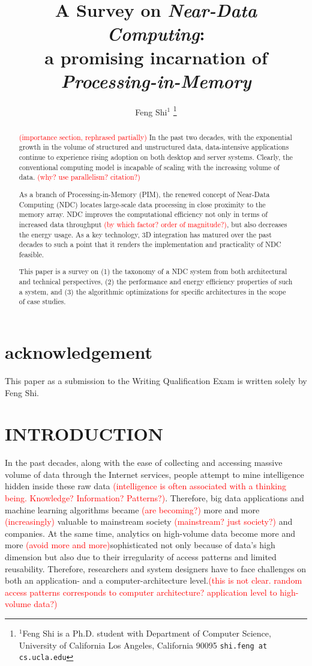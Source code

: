 \documentclass[letterpaper, 11pt, conference, margin=1in]{ieeeconf}   %
\title{\LARGE \bf
A Survey on \textit{Near-Data Computing}: \\ a promising incarnation of \textit{Processing-in-Memory}
}
\author{Feng Shi$^{1}$ %
\thanks{$^{1}$Feng Shi is a Ph.D. student with Department of Computer Science,
        University of California Los Angeles, California 90095
        {\tt\small shi.feng at cs.ucla.edu} }%
}
\newcommand\myworries[1]{\textcolor{red}{(#1)}}
\begin{document}
\maketitle
\thispagestyle{empty}
\pagestyle{empty}

\begin{abstract}
\myworries{importance section, rephrased partially}
In the past two decades, with the exponential growth in the volume of structured and unstructured data, data-intensive applications continue to experience rising adoption on both desktop and server systems. Clearly, the conventional computing model is incapable of scaling with the increasing volume of data. \myworries{why? use parallelism? citation?}

As a branch of Processing-in-Memory (PIM), the renewed concept of Near-Data Computing (NDC) locates large-scale data processing in close proximity to the memory array. NDC improves the computational efficiency not only in terms of increased data throughput \myworries{by which factor? order of magnitude?}, but also decreases the energy usage. As a key technology, 3D integration has matured over the past decades to such a point that it renders the implementation and practicality of NDC feasible.

This paper is a survey on (1) the taxonomy of a NDC system from both architectural and technical perspectives, (2) the performance and energy efficiency properties of such a system, and (3) the algorithmic optimizations for specific architectures in the scope of case studies.
\end{abstract}


\section*{\textbf{acknowledgement}}
This paper as a submission to the Writing Qualification Exam is written solely by Feng Shi.

\section{INTRODUCTION}
In the past decades, along with the ease of collecting and accessing massive volume of data through the Internet services, people attempt to mine intelligence hidden inside these raw data \myworries{intelligence is often associated with a thinking being. Knowledge? Information? Patterns?}. Therefore, big data applications and machine learning algorithms became \myworries{are becoming?} more and more \myworries{increasingly} valuable to mainstream society \myworries{mainstream? just society?} and companies. At the same time, analytics on high-volume data become more and more \myworries{avoid more and more}sophisticated not only because of data's high dimension but also due to their irregularity of access patterns and limited reusability.
Therefore, researchers and system designers have to face challenges on both an application- and a computer-architecture level.\myworries{this is not clear. random access patterns corresponds to computer architecture? application level to high-volume data?}
\end{document}
